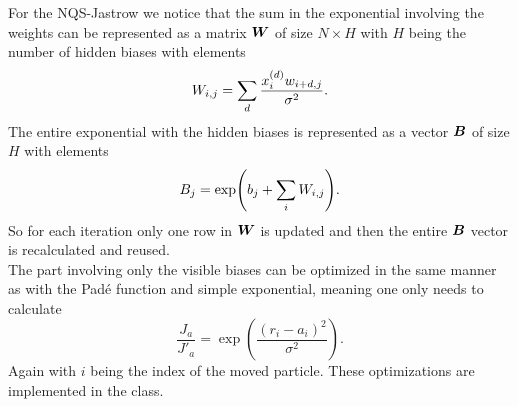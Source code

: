     For the NQS-Jastrow we notice that the sum in the exponential involving the
    weights can be represented as a matrix $\boldsymbol{{W}}$ of size $N\times H$ with
    $H$ being the number of hidden biases with elements
        \begin{equation}
            W_{i,j} = \sum\limits_{d}\frac{x^{(d)}_iw_{i+d,j}}{\sigma^2}.
        \end{equation}
    The entire exponential with the hidden biases is represented as a vector
    $\boldsymbol{{B}}$ of size $H$ with elements
        \begin{equation}
            B_j = \exp(b_j + \sum\limits_{i} W_{i,j}).
        \end{equation}
    So for each iteration only one row in $\boldsymbol{{W}}$ is updated and then the
    entire $\boldsymbol{{B}}$ vector is recalculated and reused. \\ 
    The part involving only the visible biases can be optimized in the same
    manner as with the Pad\'e function and simple exponential, meaning one only
    needs to calculate
        \begin{equation}
            \frac{J_a}{J'_a} = \exp(\frac{\left(r_i -
            a_i\right)^2}{\sigma^2}).
        \end{equation}
    Again with $i$ being the index of the moved particle. These optimizations
    are implemented in the  class.

